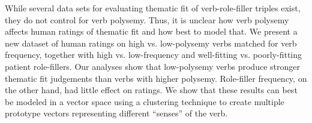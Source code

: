 While several data sets for evaluating thematic fit of verb-role-filler triples exist, they do not control for verb polysemy. Thus, it is unclear how verb polysemy affects human ratings of thematic fit and how best to model that. We present a new dataset of human ratings on high vs. low-polysemy verbs matched for verb frequency, together with high vs. low-frequency and well-fitting vs. poorly-fitting patient role-fillers. Our analyses show that low-polysemy verbs produce stronger thematic fit judgements than verbs with higher polysemy. Role-filler frequency, on the other hand, had little effect on ratings. We show that these results can best be modeled in a vector space using a clustering technique to create multiple prototype vectors representing different ``senses'' of the verb.

